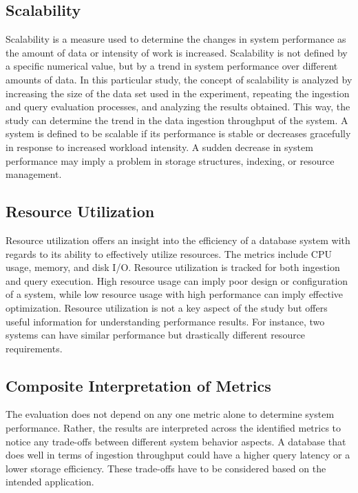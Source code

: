 \subsection{Scalability}
Scalability is a measure used to determine the changes in system performance as the amount of data or intensity of work is increased. Scalability is not defined by a specific numerical value, but by a trend in system performance over different amounts of data. In this particular study, the concept of scalability is analyzed by increasing the size of the data set used in the experiment, repeating the ingestion and query evaluation processes, and analyzing the results obtained. This way, the study can determine the trend in the data ingestion throughput of the system. A system is defined to be scalable if its performance is stable or decreases gracefully in response to increased workload intensity. A sudden decrease in system performance may imply a problem in storage structures, indexing, or resource management.



\subsection{Resource Utilization}
Resource utilization offers an insight into the efficiency of a database system with regards to its ability to effectively utilize resources. The metrics include CPU usage, memory, and disk I/O. Resource utilization is tracked for both ingestion and query execution. High resource usage can imply poor design or configuration of a system, while low resource usage with high performance can imply effective optimization. Resource utilization is not a key aspect of the study but offers useful information for understanding performance results. For instance, two systems can have similar performance but drastically different resource requirements. 


\subsection{Composite Interpretation of Metrics}
The evaluation does not depend on any one metric alone to determine system performance. Rather, the results are interpreted across the identified metrics to notice any trade-offs between different system behavior aspects. A database that does well in terms of ingestion throughput could have a higher query latency or a lower storage efficiency. These trade-offs have to be considered based on the intended application. 

